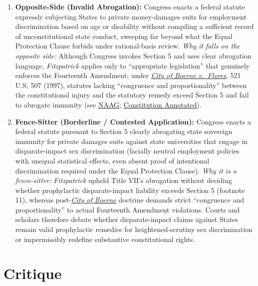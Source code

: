 \documentclass[12pt]{article}
\begin{document}
\begin{enumerate}
\item \textbf{Opposite-Side (Invalid Abrogation):} Congress enacts a federal statute expressly subjecting States to private money-damages suits for employment discrimination based on age or disability without compiling a sufficient record of unconstitutional state conduct, sweeping far beyond what the Equal Protection Clause forbids under rational-basis review. \textit{Why it falls on the opposite side:} Although Congress invokes Section 5 and uses clear abrogation language, \textit{Fitzpatrick} applies only to ``appropriate legislation'' that genuinely enforces the Fourteenth Amendment; under \href{https://supreme.justia.com/cases/federal/us/521/507/}{\textit{City of Boerne v.\ Flores}}, 521 U.S. 507 (1997), statutes lacking ``congruence and proportionality'' between the constitutional injury and the statutory remedy exceed Section 5 and fail to abrogate immunity (see \href{https://www.naag.org/attorney-general-journal/state-sovereign-immunity/}{NAAG}; \href{https://constitution.congress.gov/browse/essay/amdt14-S5-4/ALDE_00000853/}{Constitution Annotated}).

\item \textbf{Fence-Sitter (Borderline / Contested Application):} Congress enacts a federal statute pursuant to Section 5 clearly abrogating state sovereign immunity for private damages suits against state universities that engage in disparate-impact sex discrimination (facially neutral employment policies with unequal statistical effects, even absent proof of intentional discrimination required under the Equal Protection Clause). \textit{Why it is a fence-sitter:} \textit{Fitzpatrick} upheld Title VII's abrogation without deciding whether prophylactic disparate-impact liability exceeds Section 5 (footnote 11), whereas post-\href{https://supreme.justia.com/cases/federal/us/521/507/}{\textit{City of Boerne}} doctrine demands strict ``congruence and proportionality'' to actual Fourteenth Amendment violations. Courts and scholars therefore debate whether disparate-impact claims against States remain valid prophylactic remedies for heightened-scrutiny sex discrimination or impermissibly redefine substantive constitutional rights.
\end{enumerate}

\section{Critique}
\end{document}
